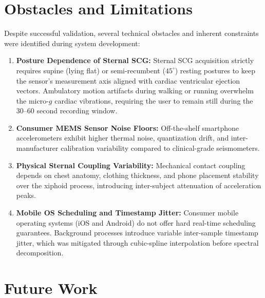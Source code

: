 \section{Obstacles and Limitations}

Despite successful validation, several technical obstacles and inherent constraints were identified during system development:
\begin{enumerate}
    \item \textbf{Posture Dependence of Sternal SCG:} Sternal SCG acquisition strictly requires supine (lying flat) or semi-recumbent ($45^\circ$) resting postures to keep the sensor's measurement axis aligned with cardiac ventricular ejection vectors. Ambulatory motion artifacts during walking or running overwhelm the micro-$g$ cardiac vibrations, requiring the user to remain still during the 30--60 second recording window.
    \item \textbf{Consumer MEMS Sensor Noise Floors:} Off-the-shelf smartphone accelerometers exhibit higher thermal noise, quantization drift, and inter-manufacturer calibration variability compared to clinical-grade seismometers.
    \item \textbf{Physical Sternal Coupling Variability:} Mechanical contact coupling depends on chest anatomy, clothing thickness, and phone placement stability over the xiphoid process, introducing inter-subject attenuation of acceleration peaks.
    \item \textbf{Mobile OS Scheduling and Timestamp Jitter:} Consumer mobile operating systems (iOS and Android) do not offer hard real-time scheduling guarantees. Background processes introduce variable inter-sample timestamp jitter, which was mitigated through cubic-spline interpolation before spectral decomposition.
\end{enumerate}

\section{Future Work}

